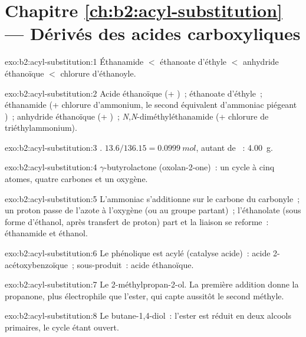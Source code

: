 \section*{Chapitre \ref{ch:b2:acyl-substitution} --- Dérivés des acides carboxyliques}

\begin{solution}{exo:b2:acyl-substitution:1}
Éthanamide $<$ éthanoate d'éthyle $<$ anhydride éthanoïque $<$ chlorure d'éthanoyle.
\end{solution}

\begin{solution}{exo:b2:acyl-substitution:2}
Acide éthanoïque (+ )~; éthanoate d'éthyle~; éthanamide (+ chlorure d'ammonium, le second
équivalent d'ammoniac piégeant )~; anhydride éthanoïque (+ )~;
\textit{N},\textit{N}-diméthyléthanamide (+ chlorure de triéthylammonium).
\end{solution}

\begin{solution}{exo:b2:acyl-substitution:3}
. $13.6/136.15 = \qty{0.0999}{mol}$, autant de
~: \qty{4.00}{g}.
\end{solution}

\begin{solution}{exo:b2:acyl-substitution:4}
$\gamma$-butyrolactone (oxolan-2-one)~: un cycle à cinq atomes, quatre carbones et un oxygène.
\end{solution}

\begin{solution}{exo:b2:acyl-substitution:5}
L'ammoniac s'additionne sur le carbone du carbonyle~; un proton passe de l'azote à l'oxygène (ou au
groupe partant)~; l'éthanolate (sous forme d'éthanol, après transfert de proton) part et la liaison
 se reforme~: éthanamide et éthanol.
\end{solution}

\begin{solution}{exo:b2:acyl-substitution:6}
Le  phénolique est acylé (catalyse acide)~: acide 2-acétoxybenzoïque~; sous-produit~: acide éthanoïque.
\end{solution}

\begin{solution}{exo:b2:acyl-substitution:7}
Le 2-méthylpropan-2-ol. La première addition donne la propanone, plus électrophile que l'ester, qui
capte aussitôt le second méthyle.
\end{solution}

\begin{solution}{exo:b2:acyl-substitution:8}
Le butane-1,4-diol~: l'ester est réduit en deux alcools primaires, le cycle étant ouvert.
\end{solution}

